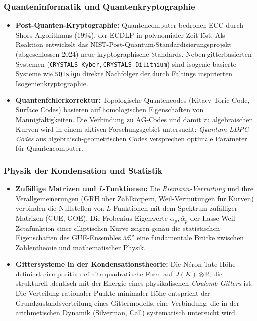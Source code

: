 ﻿\documentclass[12pt,a4paper]{article}
\theoremstyle{plain}
\theoremstyle{definition}
\theoremstyle{remark}
\newcommand{\R}{\mathbb{R}}
\begin{document}
\subsubsection{Quanteninformatik und Quantenkryptographie}

\begin{itemize}[leftmargin=2em,itemsep=4pt]
  \item \textbf{Post-Quanten-Kryptographie:}
    Quantencomputer bedrohen ECC durch Shors Algorithmus (1994), der ECDLP
    in polynomialer Zeit löst. Als Reaktion entwickelt das NIST-Post-Quantum-Standardisierungsprojekt
    (abgeschlossen 2024) neue kryptographische Standards. Neben gitterbasierten
    Systemen (\texttt{CRYSTALS-Kyber}, \texttt{CRYSTALS-Dili\newline thium})
    sind isogenie-basierte Systeme wie \texttt{SQIsign} direkte Nachfolger
    der durch Faltings inspirierten Isogenienkryptographie.

  \item \textbf{Quantenfehlerkorrektur:}
    Topologische Quantencodes (Kitaev Toric Code, Surface Codes) basieren auf
    homologischen Eigenschaften von Mannigfaltigkeiten. Die Verbindung zu
    AG-Codes und damit zu algebraischen Kurven wird in einem aktiven Forschungsgebiet
    untersucht: \emph{Quantum LDPC Codes} aus algebraisch-geometrischen Codes
    versprechen optimale Parameter für Quantencomputer.
\end{itemize}

\subsubsection{Physik der Kondensation und Statistik}

\begin{itemize}[leftmargin=2em,itemsep=4pt]
  \item \textbf{Zufällige Matrizen und $L$-Funktionen:}
    Die \emph{Riemann-Vermutung} und ihre Verallgemeinerungen (GRH über Zahlkörpern,
    Weil-Vermutungen für Kurven) verbinden die Nullstellen von $L$-Funktionen mit
    dem Spektrum zufälliger Matrizen (GUE, GOE). Die Frobenius-Eigenwerte
    $\alpha_p, \bar\alpha_p$ der Hasse-Weil-Zetafunktion einer elliptischen Kurve
    zeigen genau die statistischen Eigenschaften des GUE-Ensembles â€” eine
    fundamentale Brücke zwischen Zahlentheorie und mathematischer Physik.

  \item \textbf{Gittersysteme in der Kondensationstheorie:}
    Die Néron-Tate-Höhe definiert eine positiv definite quadratische Form auf
    $J(K) \otimes \R$, die strukturell identisch mit der Energie eines
    physikalischen \emph{Coulomb-Gitters} ist. Die Verteilung rationaler Punkte
    minimaler Höhe entspricht der Grundzustandsverteilung eines Gittermodells,
    eine Verbindung, die in der arithmetischen Dynamik (Silverman, Call) systematisch
    untersucht wird.
\end{itemize}
\end{document}
